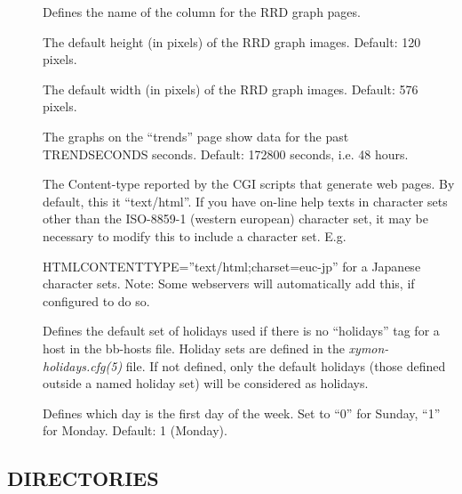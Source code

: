 \begin{description}
\item[] Defines the name of the column for the RRD graph pages. 

\item[] The default height (in pixels) of the RRD graph images. Default: 120 pixels. 

\item[] The default width (in pixels) of the RRD graph images. Default: 576 pixels. 

\item[] The graphs on the ``trends'' page show data for
  the past TRENDSECONDS seconds. Default: 172800 seconds, i.e. 48
  hours. 
 

\item[] The Content-type reported by the CGI scripts
  that generate web pages. By default, this it ``text/html''. If you
  have on-line help texts in character sets other than the ISO-8859-1
  (western european) character set, it may be necessary to modify this
  to include a character set. E.g.  

 
HTMLCONTENTTYPE=''text/html;charset=euc-jp''   for a Japanese
character sets. Note: Some webservers will automatically add this, if
configured to do so. 



\item[] Defines the default set of holidays used if there is
  no ``holidays'' tag for a host in the bb-hosts file. Holiday sets
  are defined in the \emph{xymon-holidays.cfg(5)} file. If not
  defined, only the default holidays (those defined outside a named
  holiday set) will be considered as holidays. 



\item[] Defines which day is the first day of the week. Set
  to ``0'' for Sunday, ``1'' for Monday. Default: 1 (Monday). 
 

\end{description}

\subsection{DIRECTORIES}

